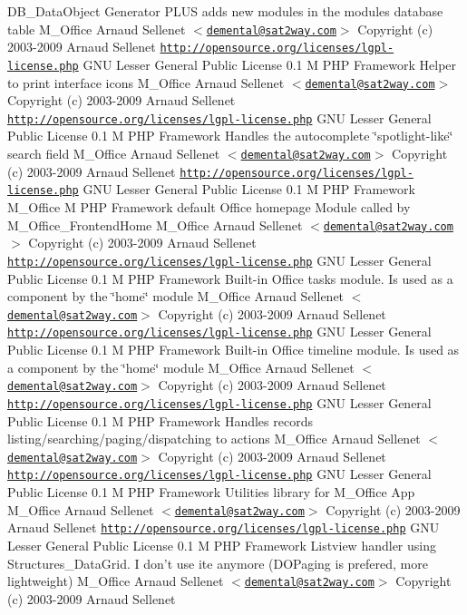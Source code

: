 \begin{Desc}
DB\_\-DataObject Generator PLUS adds new modules in the modules database table   M\_\-Office  Arnaud Sellenet $<$\href{mailto:demental@sat2way.com}{\tt demental@sat2way.com}$>$  Copyright (c) 2003-2009 Arnaud Sellenet  \href{http://opensource.org/licenses/lgpl-license.php}{\tt http://opensource.org/licenses/lgpl-license.php} GNU Lesser General Public License  0.1  M PHP Framework  Helper to print interface icons   M\_\-Office  Arnaud Sellenet $<$\href{mailto:demental@sat2way.com}{\tt demental@sat2way.com}$>$  Copyright (c) 2003-2009 Arnaud Sellenet  \href{http://opensource.org/licenses/lgpl-license.php}{\tt http://opensource.org/licenses/lgpl-license.php} GNU Lesser General Public License  0.1  M PHP Framework  Handles the autocomplete \char`\"{}spotlight-like\char`\"{} search field   M\_\-Office  Arnaud Sellenet $<$\href{mailto:demental@sat2way.com}{\tt demental@sat2way.com}$>$  Copyright (c) 2003-2009 Arnaud Sellenet  \href{http://opensource.org/licenses/lgpl-license.php}{\tt http://opensource.org/licenses/lgpl-license.php} GNU Lesser General Public License  0.1  M PHP Framework   M\_\-Office  M PHP Framework  default Office homepage Module called by M\_\-Office\_\-FrontendHome   M\_\-Office  Arnaud Sellenet $<$\href{mailto:demental@sat2way.com}{\tt demental@sat2way.com}$>$  Copyright (c) 2003-2009 Arnaud Sellenet  \href{http://opensource.org/licenses/lgpl-license.php}{\tt http://opensource.org/licenses/lgpl-license.php} GNU Lesser General Public License  0.1  M PHP Framework  Built-in Office tasks module. Is used as a component by the \char`\"{}home\char`\"{} module   M\_\-Office  Arnaud Sellenet $<$\href{mailto:demental@sat2way.com}{\tt demental@sat2way.com}$>$  Copyright (c) 2003-2009 Arnaud Sellenet  \href{http://opensource.org/licenses/lgpl-license.php}{\tt http://opensource.org/licenses/lgpl-license.php} GNU Lesser General Public License  0.1  M PHP Framework  Built-in Office timeline module. Is used as a component by the \char`\"{}home\char`\"{} module   M\_\-Office  Arnaud Sellenet $<$\href{mailto:demental@sat2way.com}{\tt demental@sat2way.com}$>$  Copyright (c) 2003-2009 Arnaud Sellenet  \href{http://opensource.org/licenses/lgpl-license.php}{\tt http://opensource.org/licenses/lgpl-license.php} GNU Lesser General Public License  0.1  M PHP Framework  Handles records listing/searching/paging/dispatching to actions   M\_\-Office  Arnaud Sellenet $<$\href{mailto:demental@sat2way.com}{\tt demental@sat2way.com}$>$  Copyright (c) 2003-2009 Arnaud Sellenet  \href{http://opensource.org/licenses/lgpl-license.php}{\tt http://opensource.org/licenses/lgpl-license.php} GNU Lesser General Public License  0.1  M PHP Framework  Utilities library for M\_\-Office App   M\_\-Office  Arnaud Sellenet $<$\href{mailto:demental@sat2way.com}{\tt demental@sat2way.com}$>$  Copyright (c) 2003-2009 Arnaud Sellenet  \href{http://opensource.org/licenses/lgpl-license.php}{\tt http://opensource.org/licenses/lgpl-license.php} GNU Lesser General Public License  0.1  M PHP Framework  Listview handler using Structures\_\-DataGrid. I don't use ite anymore (DOPaging is prefered, more lightweight)   M\_\-Office  Arnaud Sellenet $<$\href{mailto:demental@sat2way.com}{\tt demental@sat2way.com}$>$  Copyright (c) 2003-2009 Arnaud Sellenet  
\end{Desc}
